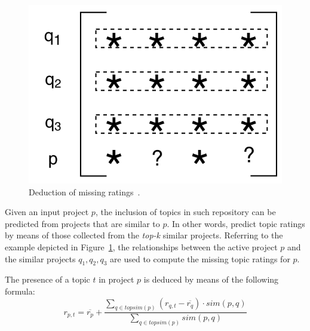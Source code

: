 \begin{figure}[t!]
\centering
\includegraphics[width=0.60\linewidth]{figs/matrix.pdf}
\vspace{-.4cm}
\caption{Deduction of missing ratings~\cite{Zhao:2010:UCR:1748610.1749278}.}%
\vspace{-.1cm}
\label{fig:UserBasedCF}
\end{figure}


Given an input project $p$, the inclusion of topics in such repository can be predicted from projects that are similar to $p$. In other words, \TF predict topic ratings  by means of those collected from the \emph{top-k} similar projects.
Referring to the example depicted in Figure~\ref{fig:UserBasedCF}, 
the relationships between the active project $p$ and the similar projects $q_1,q_2,q_3$ are used to compute the missing topic ratings for $p$. 



The presence of a topic $t$ in project $p$ is deduced by means of the following formula:
\begin{equation} \label{eqn:Prediction}
r_{p,t}=\overline{r_{p}}+\frac{\sum_{q \in topsim(p)}(r_{q,t}-\overline{r_{q}})\cdot sim(p,q) }{\sum_{q \in topsim(p)} sim(p,q) } %
\end{equation}


